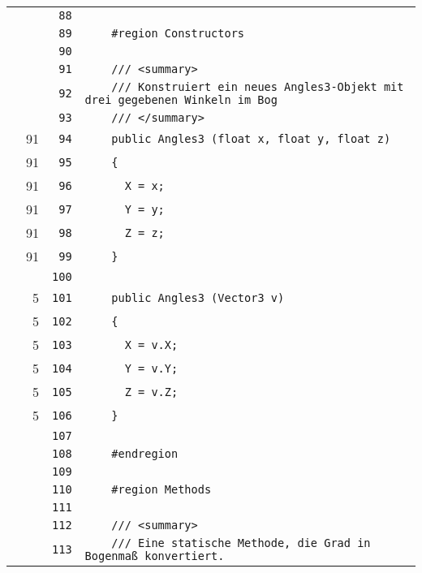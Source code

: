 \documentclass[a4paper,10pt]{article}
\begin{document}
\begin{longtable}[l]{lrrl}
\cellcolor{gray} &  & \verb~88~ & \verb~~\\
\cellcolor{gray} &  & \verb~89~ & \verb~    #region Constructors~\\
\cellcolor{gray} &  & \verb~90~ & \verb~~\\
\cellcolor{gray} &  & \verb~91~ & \verb~    /// <summary>~\\
\cellcolor{gray} &  & \verb~92~ & \verb~    /// Konstruiert ein neues Angles3-Objekt mit drei gegebenen Winkeln im Bog~\\
\cellcolor{gray} &  & \verb~93~ & \verb~    /// </summary>~\\
\cellcolor{green} & 91 & \verb~94~ & \verb~    public Angles3 (float x, float y, float z)~\\
\cellcolor{green} & 91 & \verb~95~ & \verb~    {~\\
\cellcolor{green} & 91 & \verb~96~ & \verb~      X = x;~\\
\cellcolor{green} & 91 & \verb~97~ & \verb~      Y = y;~\\
\cellcolor{green} & 91 & \verb~98~ & \verb~      Z = z;~\\
\cellcolor{green} & 91 & \verb~99~ & \verb~    }~\\
\cellcolor{gray} &  & \verb~100~ & \verb~~\\
\cellcolor{green} & 5 & \verb~101~ & \verb~    public Angles3 (Vector3 v)~\\
\cellcolor{green} & 5 & \verb~102~ & \verb~    {~\\
\cellcolor{green} & 5 & \verb~103~ & \verb~      X = v.X;~\\
\cellcolor{green} & 5 & \verb~104~ & \verb~      Y = v.Y;~\\
\cellcolor{green} & 5 & \verb~105~ & \verb~      Z = v.Z;~\\
\cellcolor{green} & 5 & \verb~106~ & \verb~    }~\\
\cellcolor{gray} &  & \verb~107~ & \verb~~\\
\cellcolor{gray} &  & \verb~108~ & \verb~    #endregion~\\
\cellcolor{gray} &  & \verb~109~ & \verb~~\\
\cellcolor{gray} &  & \verb~110~ & \verb~    #region Methods~\\
\cellcolor{gray} &  & \verb~111~ & \verb~~\\
\cellcolor{gray} &  & \verb~112~ & \verb~    /// <summary>~\\
\cellcolor{gray} &  & \verb~113~ & \verb~    /// Eine statische Methode, die Grad in Bogenmaß konvertiert.~\\

\end{longtable}
\end{document}
